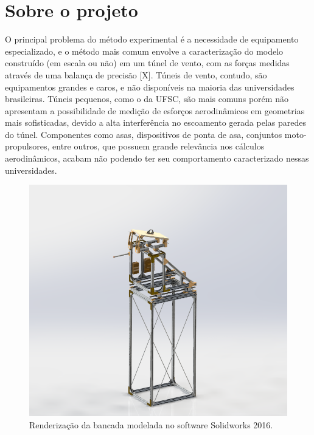 \section{Sobre o projeto}

O principal problema do método experimental é a necessidade de equipamento especializado, e o método mais comum envolve a caracterização do modelo construído (em escala ou não) em um túnel de vento, com as forças medidas através de uma balança de precisão [X]. Túneis de vento, contudo, são equipamentos grandes e caros, e não disponíveis na maioria das universidades brasileiras. Túneis pequenos, como o da UFSC, são mais comuns porém não apresentam a possibilidade de medição de esforços aerodinâmicos em geometrias mais sofisticadas, devido a alta interferência no escoamento gerada pelas paredes do túnel. Componentes como asas, dispositivos de ponta de asa, conjuntos moto-propulsores, entre outros, que possuem grande relevância nos cálculos aerodinâmicos, acabam não podendo ter seu comportamento caracterizado nessas universidades.

\begin{figure}[!ht]
    \centering
    \includegraphics[width=.8\linewidth]{figuras/renders/perspectiva_sem_asa_com_pitot.png}
    \caption{Renderização da bancada modelada no software Solidworks 2016\cite{autor}.}
    \label{fig:placeholder}
\end{figure}

